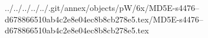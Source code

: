 ../../../../../.git/annex/objects/pW/6x/MD5E-s4476--d678866510ab4c2e8e04ec8b8cb278e5.tex/MD5E-s4476--d678866510ab4c2e8e04ec8b8cb278e5.tex